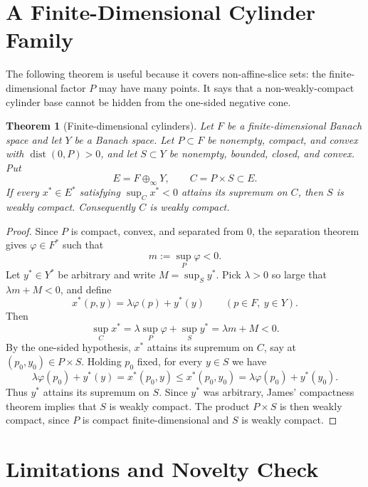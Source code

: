 \documentclass[11pt]{article}
\newtheorem{theorem}{Theorem}
\newcommand{\dist}{\operatorname{dist}}
\begin{document}
\section*{A Finite-Dimensional Cylinder Family}

The following theorem is useful because it covers non-affine-slice sets:
the finite-dimensional factor \(P\) may have many points. It says that a
non-weakly-compact cylinder base cannot be hidden from the one-sided
negative cone.

\begin{theorem}[Finite-dimensional cylinders]
\label{thm:cylinder}
Let \(F\) be a finite-dimensional Banach space and let \(Y\) be a Banach
space. Let \(P\subset F\) be nonempty, compact, and convex with
\(\dist(0,P)>0\), and let \(S\subset Y\) be nonempty, bounded, closed,
and convex. Put
\[
  E=F\oplus_\infty Y,\qquad C=P\times S\subset E.
\]
If every \(x^\ast\in E^\ast\) satisfying \(\sup_C x^\ast<0\) attains its
supremum on \(C\), then \(S\) is weakly compact. Consequently \(C\) is
weakly compact.
\end{theorem}

\begin{proof}
Since \(P\) is compact, convex, and separated from \(0\), the separation
theorem gives \(\varphi\in F^\ast\) such that
\[
  m:=\sup_P \varphi<0.
\]
Let \(y^\ast\in Y^\ast\) be arbitrary and write \(M=\sup_S y^\ast\). Pick
\(\lambda>0\) so large that \(\lambda m+M<0\), and define
\[
  x^\ast(p,y)=\lambda\varphi(p)+y^\ast(y)
  \qquad(p\in F,\ y\in Y).
\]
Then
\[
  \sup_C x^\ast=\lambda\sup_P\varphi+\sup_S y^\ast=\lambda m+M<0.
\]
By the one-sided hypothesis, \(x^\ast\) attains its supremum on \(C\), say
at \((p_0,y_0)\in P\times S\). Holding \(p_0\) fixed, for every \(y\in S\)
we have
\[
  \lambda\varphi(p_0)+y^\ast(y)
  =
  x^\ast(p_0,y)
  \leq
  x^\ast(p_0,y_0)
  =
  \lambda\varphi(p_0)+y^\ast(y_0).
\]
Thus \(y^\ast\) attains its supremum on \(S\). Since \(y^\ast\) was
arbitrary, James' compactness theorem implies that \(S\) is weakly
compact. The product \(P\times S\) is then weakly compact, since \(P\) is
compact finite-dimensional and \(S\) is weakly compact.
\end{proof}

\section*{Limitations and Novelty Check}
\end{document}
